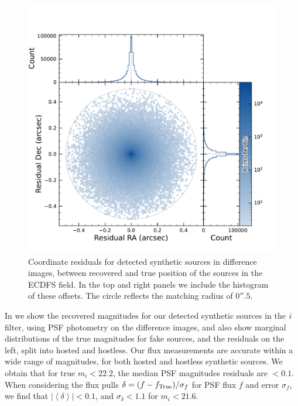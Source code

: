 \begin{figure}[htb!]
\centering
\includegraphics[trim={0 0 0 0},width=\linewidth]{figures/coordinate_offsets_hexbin.pdf}
\caption{Coordinate residuals for detected synthetic sources in difference images, between recovered and true position of the sources in the \gls{ECDFS} field. In the top and right panels we include the histogram of these offsets. The circle reflects the matching radius of $0''.5$.}
\label{fig:coordinate_offset_diffim_fakes}
\end{figure}
%
In  we show the recovered magnitudes for our detected synthetic sources in the \textit{i} filter, using \gls{PSF} photometry on the difference images, and also show marginal distributions of the true magnitudes for fake sources, and the residuals on the left, split into hosted and hostless.
%
Our \gls{flux} measurements are accurate within a wide range of magnitudes, for both hosted and hostless synthetic sources. We obtain that for true $m_i < 22.2$, the median PSF magnitudes residuals are $<0.1$. When considering the \gls{flux} pulls $\delta = (f-f_{\rm{True}})/\sigma_f$ for PSF \gls{flux} $f$ and error $\sigma_f$, we find that $|\left<\delta\right>| <0.1$, and $\sigma_\delta < 1.1$ for $m_i<21.6$.
%
